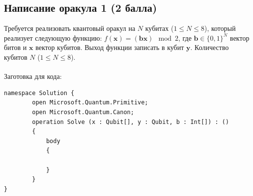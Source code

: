 \documentclass[a4paper,12pt]{article}
\begin{document}
\subsection{Написание оракула 1 (2 балла)}

Требуется реализовать квантовый оракул на $N$ кубитах ($1 \le N \le 8$), который реализует следующую функцию: $f(\pmb{x}) = (\pmb{b}\pmb{x}) \mod 2$, где  $\pmb{b} \in \{0,1\}^N$ вектор битов и  $\pmb{x}$ вектор кубитов. Выход функции записать в кубит $\pmb{y}$. Количество кубитов $N$ ($1 \le N \le 8$). 
\\\\
Заготовка для кода:
\begin{lstlisting}
namespace Solution {
        open Microsoft.Quantum.Primitive;
        open Microsoft.Quantum.Canon;
        operation Solve (x : Qubit[], y : Qubit, b : Int[]) : ()
        {
            body
            {

            }
        }
}
\end{lstlisting}
\end{document}
